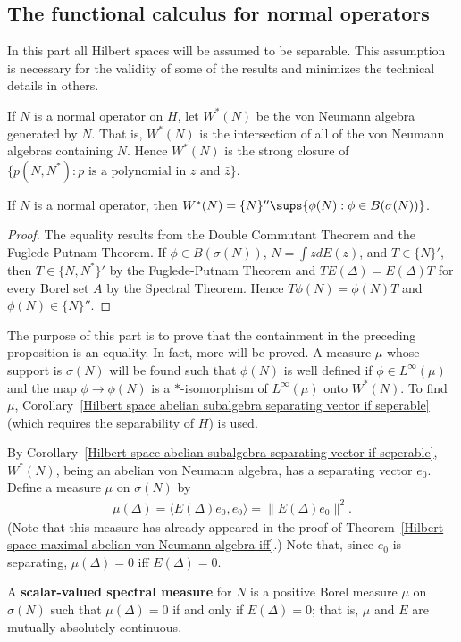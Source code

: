 \subsection{The functional calculus for normal operators}
In this part all Hilbert spaces will be assumed to be separable. This assumption is necessary for the validity of some of the results and minimizes the technical details in others.\par
If $N$ is a normal operator on $H$, let $W^*(N)$ be the von Neumann algebra generated by $N$. That is, $W^*(N)$ is the intersection of all of the von Neumann algebras containing $N$. Hence $W^*(N)$ is the strong closure of $\{p(N,N^*):\text{$p$ is a polynomial in $z$ and $\bar{z}$}\}$.
\begin{proposition}\label{Hilbert space normal opearator generate von Neumann}
If $N$ is a normal operator, then $W^*(N)=\{N\}''\sups\{\phi(N):\phi\in B(\sigma(N))\}$.
\end{proposition}
\begin{proof}
The equality results from the Double Commutant Theorem and the Fuglede-Putnam Theorem. If $\phi\in B(\sigma(N))$, $N=\int zdE(z)$, and $T\in\{N\}'$, then $T\in\{N,N^*\}'$ by the Fuglede-Putnam Theorem and $TE(\Delta)=E(\Delta)T$ for every Borel set $A$ by the Spectral Theorem. Hence $T\phi(N)=\phi(N)T$ and $\phi(N)\in\{N\}''$.
\end{proof}
The purpose of this part is to prove that the containment in the preceding proposition is an equality. In fact, more will be proved. A measure $\mu$ whose support is $\sigma(N)$ will be found such that $\phi(N)$ is well defined if $\phi\in L^\infty(\mu)$ and the map $\phi\to\phi(N)$ is a $*$-isomorphism of $L^\infty(\mu)$ onto $W^*(N)$. To find $\mu$, Corollary~\ref{Hilbert space abelian subalgebra separating vector if seperable} (which requires the separability of $H$) is used.\par
By Corollary~\ref{Hilbert space abelian subalgebra separating vector if seperable}, $W^*(N)$, being an abelian von Neumann algebra, has a separating vector $e_0$. Define a measure $\mu$ on $\sigma(N)$ by
\begin{align}\label{Hilbert space scalar spectral measure def}
\mu(\Delta)=\langle E(\Delta)e_0,e_0\rangle=\|E(\Delta)e_0\|^2.
\end{align}
(Note that this measure has already appeared in the proof of Theorem~\ref{Hilbert space maximal abelian von Neumann algebra iff}.) Note that, since $e_0$ is separating, $\mu(\Delta)=0$ iff $E(\Delta)=0$.
\begin{definition}
A \textbf{scalar-valued spectral measure} for $N$ is a positive Borel measure $\mu$ on $\sigma(N)$ such that $\mu(\Delta)=0$ if and only if $E(\Delta)=0$; that is, $\mu$ and $E$ are mutually absolutely continuous.
\end{definition}
